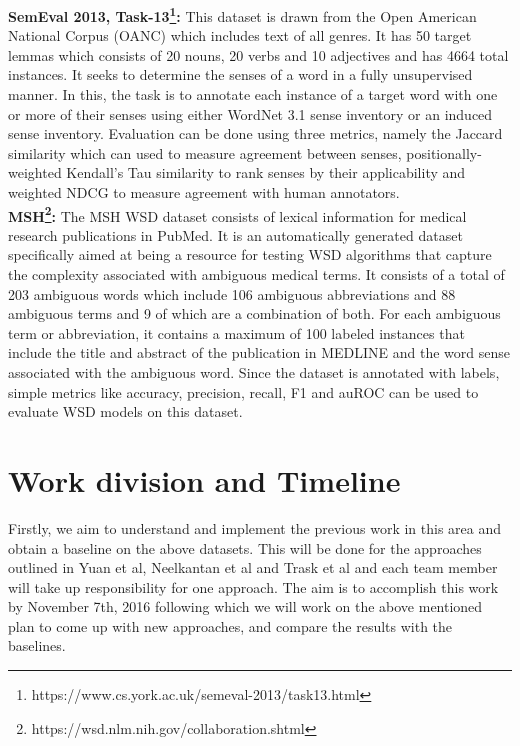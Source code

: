 \documentclass{article}
\begin{document}
\textbf{SemEval 2013, Task-13\footnote{https://www.cs.york.ac.uk/semeval-2013/task13.html}:} This dataset is drawn from the Open American National Corpus (OANC) which includes text of all genres. It has 50 target lemmas which consists of 20 nouns, 20 verbs and 10 adjectives and has 4664 total instances. It seeks to determine the senses of a word in a fully unsupervised manner. In this, the task is to annotate each instance of a target word with one or more of their senses using either WordNet 3.1 sense inventory or an induced sense inventory. Evaluation can be done using three metrics, namely the Jaccard similarity which can used to measure agreement between senses, positionally-weighted Kendall’s Tau similarity to rank senses by their applicability and weighted NDCG to measure agreement with human annotators.\\


\textbf{MSH\footnote{https://wsd.nlm.nih.gov/collaboration.shtml}:} The MSH WSD dataset consists of lexical information for medical research publications in PubMed. It is an automatically generated dataset specifically aimed at being a resource for testing WSD algorithms that capture the complexity associated with ambiguous medical terms. It consists of a total of 203 ambiguous words which include 106 ambiguous abbreviations and 88 ambiguous terms and 9 of which are a combination of both. For each ambiguous term or abbreviation, it contains a maximum of 100 labeled instances that include the title and abstract of the publication in MEDLINE and the word sense associated with the ambiguous word. Since the dataset is annotated with labels, simple metrics like accuracy, precision, recall, F1 and auROC can be used to evaluate WSD models on this dataset.\\

\section{Work division and Timeline}
Firstly, we aim to understand and implement the previous work in this area and obtain a baseline on the above datasets. This will be done for the approaches outlined in Yuan et al\cite{yuan2016word}, Neelkantan et al\cite{neelakantan2015efficient} and Trask et al\cite{trask2015sense2vec} and each team member will take up responsibility for one approach. The aim is to accomplish this work by November 7th, 2016 following which we will work on the above mentioned plan to come up with new approaches, and compare the results with the baselines.



\nocite{*}

\end{document}
